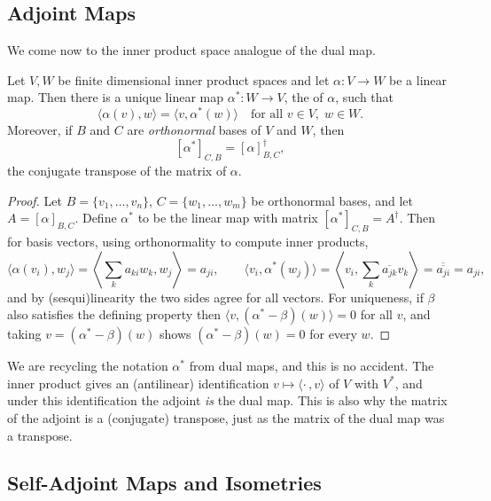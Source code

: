\documentclass[a4paper]{scrartcl}
\begin{document}
\subsection{Adjoint Maps}

We come now to the inner product space analogue of the dual map.

\begin{theorem}
    Let $V, W$ be finite dimensional inner product spaces and let $\alpha: V \rightarrow W$ be a linear map. Then there is a unique linear map $\alpha^*: W \rightarrow V$, the  of $\alpha$, such that
    $$
    \langle \alpha(v), w \rangle = \langle v, \alpha^*(w)\rangle \quad \text{for all } v \in V,\; w \in W.
    $$
    Moreover, if $B$ and $C$ are \emph{orthonormal} bases of $V$ and $W$, then
    $$
    [\alpha^*]_{C, B} = [\alpha]_{B,C}^\dagger,
    $$
    the conjugate transpose of the matrix of $\alpha$.
\end{theorem}
\begin{proof}
    Let $B = \{v_1, \dots, v_n\}$, $C = \{w_1, \dots, w_m\}$ be orthonormal bases, and let $A = [\alpha]_{B, C}$. Define $\alpha^*$ to be the linear map with matrix $[\alpha^*]_{C,B} = A^\dagger$. Then for basis vectors, using orthonormality to compute inner products,
    $$
    \langle \alpha(v_i), w_j \rangle = \left\langle \sum_{k} a_{ki} w_k, w_j \right\rangle = a_{ji}, \qquad
    \langle v_i, \alpha^*(w_j) \rangle = \left\langle v_i, \sum_k \overline{a_{jk}} v_k \right\rangle = \overline{\overline{a_{ji}}} = a_{ji},
    $$
    and by (sesqui)linearity the two sides agree for all vectors. For uniqueness, if $\beta$ also satisfies the defining property then $\langle v, (\alpha^* - \beta)(w)\rangle = 0$ for all $v$, and taking $v = (\alpha^* - \beta)(w)$ shows $(\alpha^* - \beta)(w) = 0$ for every $w$.
\end{proof}

\begin{remark}
    We are recycling the notation $\alpha^*$ from dual maps, and this is no accident. The inner product gives an (antilinear) identification $v \mapsto \langle \cdot\,, v \rangle$ of $V$ with $V^*$, and under this identification the adjoint \emph{is} the dual map. This is also why the matrix of the adjoint is a (conjugate) transpose, just as the matrix of the dual map was a transpose.
\end{remark}

\subsection{Self-Adjoint Maps and Isometries}
\end{document}

